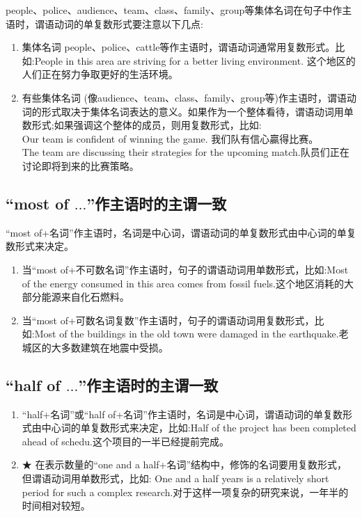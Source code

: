 people、police、audience、team、class、family、group等集体名词在句子中作主语时，谓语动词的单复数形式要注意以下几点:
\begin{enumerate}
  \item 集体名词 people、police、cattle等作主语时，谓语动词通常用复数形式。比如:People in this area are striving for a better living environment. 这个地区的人们正在努力争取更好的生活环境。
  \item 有些集体名词 (像audience、team、class、family、group等)作主语时，谓语动词的形式取决于集体名词表达的意义。如果作为一个整体看待，谓语动词用单数形式;如果强调这个整体的成员，则用复数形式，比如:\\
        Our team is confident of winning the game. 我们队有信心贏得比赛。\\
        The team are discussing their strategies for the upcoming match.队员们正在讨论即将到来的比赛策略。
\end{enumerate}

\subsection{“most of \(\ldots\)”作主语时的主谓一致}

“most of+名词”作主语时，名词是中心词，谓语动词的单复数形式由中心词的单复数形式来决定。
\begin{enumerate}
  \item 当“most of+不可数名词”作主语时，句子的谓语动词用单数形式，比如:Most of the energy consumed in this area comes from fossil fuels.这个地区消耗的大部分能源来自化石燃料。
  \item 当“most of+可数名词复数”作主语时，句子的谓语动词用复数形式，比如:Most of the buildings in the old town were damaged in the earthquake.老城区的大多数建筑在地震中受损。
\end{enumerate}

\subsection{“half of \(\ldots\)”作主语时的主谓一致}

\begin{enumerate}
  \item “half+名词”或“half of+名词”作主语时，名词是中心词，谓语动词的单复数形式由中心词的单复数形式来决定，比如:Half of the project has been completed ahead of schedu.这个项目的一半已经提前完成。
  \item ★ 在表示数量的“one and a half+名词”结构中，修饰的名词要用复数形式，但谓语动词用单数形式，比如: One and a half years is a relatively short period for such a complex research.对于这样一项复杂的研究来说，一年半的时间相对较短。
\end{enumerate}

